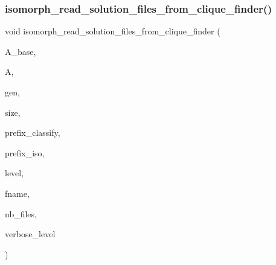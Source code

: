 \subsubsection{\texorpdfstring{isomorph\+\_\+read\+\_\+solution\+\_\+files\+\_\+from\+\_\+clique\+\_\+finder()}{isomorph\_read\_solution\_files\_from\_clique\_finder()}}
{\footnotesize\ttfamily void isomorph\+\_\+read\+\_\+solution\+\_\+files\+\_\+from\+\_\+clique\+\_\+finder (\begin{DoxyParamCaption}\item[{\mbox{\hyperlink{classaction}{action}} $\ast$}]{A\+\_\+base,  }\item[{\mbox{\hyperlink{classaction}{action}} $\ast$}]{A,  }\item[{\mbox{\hyperlink{classgenerator}{generator}} $\ast$}]{gen,  }\item[{\mbox{\hyperlink{galois_8h_a09fddde158a3a20bd2dcadb609de11dc}{I\+NT}}}]{size,  }\item[{const \mbox{\hyperlink{galois_8h_ab6cc7b4aeb6ea31aba2b3fbfc83ff5e6}{B\+Y\+TE}} $\ast$}]{prefix\+\_\+classify,  }\item[{const \mbox{\hyperlink{galois_8h_ab6cc7b4aeb6ea31aba2b3fbfc83ff5e6}{B\+Y\+TE}} $\ast$}]{prefix\+\_\+iso,  }\item[{\mbox{\hyperlink{galois_8h_a09fddde158a3a20bd2dcadb609de11dc}{I\+NT}}}]{level,  }\item[{const \mbox{\hyperlink{galois_8h_ab6cc7b4aeb6ea31aba2b3fbfc83ff5e6}{B\+Y\+TE}} $\ast$$\ast$}]{fname,  }\item[{\mbox{\hyperlink{galois_8h_a09fddde158a3a20bd2dcadb609de11dc}{I\+NT}}}]{nb\+\_\+files,  }\item[{\mbox{\hyperlink{galois_8h_a09fddde158a3a20bd2dcadb609de11dc}{I\+NT}}}]{verbose\+\_\+level }\end{DoxyParamCaption})}

\mbox{\label{isomorph__global_8_c_a2a55ab4b2df6ae83f916cf01eccdf67c}} 
